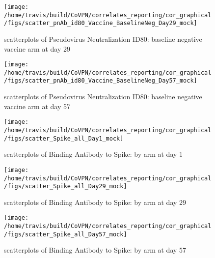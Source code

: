 \documentclass[]{book}
\theoremstyle{definition}
\theoremstyle{definition}
\theoremstyle{definition}
\newcommand{\1}{\mathbbm{1}}
\begin{document}
\clearpage
\begin{figure}[H]

{\centering \texttt{[image: /home/travis/build/CoVPN/correlates\_reporting/cor\_graphical/figs/scatter\_pnAb\_id80\_Vaccine\_BaselineNeg\_Day29\_mock]} 

}

\caption{scatterplots of Pseudovirus Neutralization ID80: baseline negative vaccine arm at day 29}\label{fig:unnamed-chunk-261}
\end{figure}

\clearpage
\begin{figure}[H]

{\centering \texttt{[image: /home/travis/build/CoVPN/correlates\_reporting/cor\_graphical/figs/scatter\_pnAb\_id80\_Vaccine\_BaselineNeg\_Day57\_mock]} 

}

\caption{scatterplots of Pseudovirus Neutralization ID80: baseline negative vaccine arm at day 57}\label{fig:unnamed-chunk-262}
\end{figure}

\clearpage
\begin{figure}[H]

{\centering \texttt{[image: /home/travis/build/CoVPN/correlates\_reporting/cor\_graphical/figs/scatter\_Spike\_all\_Day1\_mock]} 

}

\caption{scatterplots of Binding Antibody to Spike: by arm at day 1}\label{fig:unnamed-chunk-263}
\end{figure}

\clearpage
\begin{figure}[H]

{\centering \texttt{[image: /home/travis/build/CoVPN/correlates\_reporting/cor\_graphical/figs/scatter\_Spike\_all\_Day29\_mock]} 

}

\caption{scatterplots of Binding Antibody to Spike: by arm at day 29}\label{fig:unnamed-chunk-264}
\end{figure}

\clearpage
\begin{figure}[H]

{\centering \texttt{[image: /home/travis/build/CoVPN/correlates\_reporting/cor\_graphical/figs/scatter\_Spike\_all\_Day57\_mock]} 

}

\caption{scatterplots of Binding Antibody to Spike: by arm at day 57}\label{fig:unnamed-chunk-265}
\end{figure}
\end{document}
